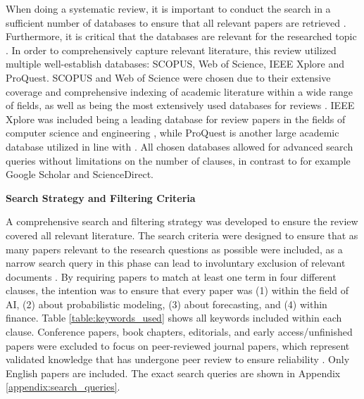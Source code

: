 When doing a systematic review, it is important to conduct the search in a sufficient number of databases to ensure that all relevant papers are retrieved \parencite{hiebl_2021}. Furthermore, it is critical that the databases are relevant for the researched topic \parencite{marzi_et_al_2024}. In order to comprehensively capture relevant literature, this review utilized multiple well-establish databases: SCOPUS, Web of Science, IEEE Xplore and ProQuest. SCOPUS and Web of Science were chosen due to their extensive coverage and comprehensive indexing of academic literature within a wide range of fields, as well as being the most extensively used databases for reviews \parencite{marzi_et_al_2024}. IEEE Xplore was included being a leading database for review papers in the fields of computer science and engineering \parencite{suhaimi2020systematic, carvalho2019systematic, cavacini2015best}, while ProQuest is another large academic database utilized in line with \textcite{gunnarsson2024}. All chosen databases allowed for advanced search queries without limitations on the number of clauses, in contrast to for example Google Scholar and ScienceDirect. 

\textbf{Search Strategy and Filtering Criteria}\nopagebreak

A comprehensive search and filtering strategy was developed to ensure the review covered all relevant literature. The search criteria were designed to ensure that as many papers relevant to the research questions as possible were included, as a narrow search query in this phase can lead to involuntary exclusion of relevant documents \parencite{marzi_et_al_2024,kuhrmann2017pragmatic, williams2021reexamining}. By requiring papers to match at least one term in four different clauses, the intention was to ensure that every paper was (1) within the field of AI, (2) about probabilistic modeling, (3) about forecasting, and (4) within finance. Table \ref{table:keywords_used} shows all keywords included within each clause. Conference papers, book chapters, editorials, and early access/unfinished papers were excluded to focus on peer-reviewed journal papers, which represent validated knowledge that has undergone peer review to ensure reliability \parencite{marzi_et_al_2024, hota2022hybrid}. Only English papers are included. The exact search queries are shown in Appendix \ref{appendix:search_queries}. 

